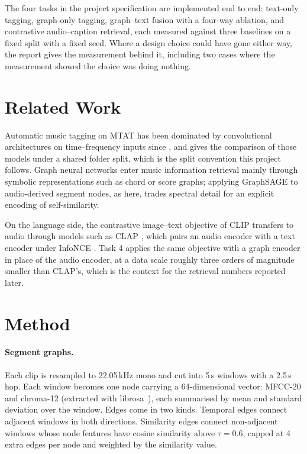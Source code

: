\documentclass{article}
\begin{document}
The four tasks in the project specification are implemented end to end: text-only
tagging, graph-only tagging, graph--text fusion with a four-way ablation, and
contrastive audio--caption retrieval, each measured against three baselines on a
fixed split with a fixed seed. Where a design choice could have gone either way,
the report gives the measurement behind it, including two cases where the
measurement showed the choice was doing nothing.

\section{Related Work}
Automatic music tagging on MTAT has been dominated by convolutional
architectures on time--frequency inputs since \cite{choi2016autotagging}, and
\cite{won2020evaluation} gives the comparison of those models under a shared
folder split, which is the split convention this project follows. Graph neural
networks enter music information retrieval mainly through symbolic
representations such as chord or score graphs; applying GraphSAGE
\cite{hamilton2017graphsage} to audio-derived segment nodes, as here, trades
spectral detail for an explicit encoding of self-similarity.

On the language side, the contrastive image--text objective of CLIP
\cite{radford2021clip} transfers to audio through models such as CLAP
\cite{elizalde2023clap}, which pairs an audio encoder with a text encoder under
InfoNCE \cite{oord2018infonce}. Task 4 applies the same objective with a graph
encoder in place of the audio encoder, at a data scale roughly three orders of
magnitude smaller than CLAP's, which is the context for the retrieval numbers
reported later.

\section{Method}

\paragraph{Segment graphs.}
Each clip is resampled to 22.05\,kHz mono and cut into 5\,s windows with a
2.5\,s hop. Each window becomes one node carrying a 64-dimensional vector:
MFCC-20 and chroma-12 (extracted with librosa~\cite{mcfee2015librosa}), each
summarised by mean and standard deviation over the window. Edges come in two
kinds. Temporal edges connect adjacent windows in both directions. Similarity
edges connect non-adjacent windows whose node features have cosine similarity
above $\tau{=}0.6$, capped at 4 extra edges per node and weighted by the
similarity value.
\end{document}

